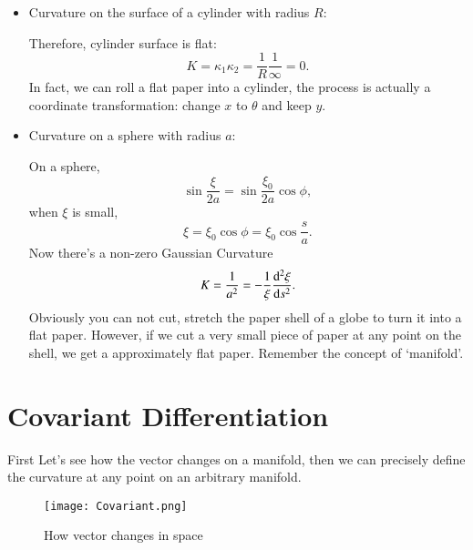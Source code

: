 \documentclass[openany,10pt]{book}
\theoremstyle{definition}
\theoremstyle{definition}
\theoremstyle{remark}
\begin{document}
\begin{itemize}
\item Curvature on the surface of a cylinder  with radius $R$:


Therefore, cylinder surface is flat:
\begin{equation}
K=\kappa_1\kappa_2=\frac{1}{R}\frac{1}{\infty}=0.
\end{equation}
In fact, we can roll a flat paper into a cylinder, the process is actually a coordinate transformation: change $x$ to $\theta$ and keep $y$.

\end{itemize}
\begin{itemize}

\item Curvature on a sphere with radius $a$:

On a sphere,
\begin{equation}
    \sin{\frac{\xi}{2a}}=\sin{\frac{\xi_0}{2a}}\cos{\phi},
\end{equation}
when $\xi$ is small,
\begin{equation}
    \xi=\xi_0 \cos{\phi}=\xi_0\cos{\frac{s}{a}}.
\end{equation}
Now there's a non-zero Gaussian Curvature
\begin{equation}
    K=\frac{1}{a^2}=-\frac1\xi\frac{{\rm d}^2\xi}{{\rm d}s^2}.
\end{equation}
Obviously you can not cut, stretch the paper shell of a globe to turn it into a flat paper. However, if we cut a very small piece of paper at any point on the shell, we get a approximately flat paper. Remember the concept of `manifold'.

\end{itemize}

\section{Covariant Differentiation}
First Let's see how the vector changes on a manifold, then we can precisely define the curvature at any point on an arbitrary manifold.

\begin{figure}[htbp]
    \centering
    \texttt{[image: Covariant.png]}
    \caption{How vector changes in space}
    \label{covariant}
\end{figure}
\end{document}
